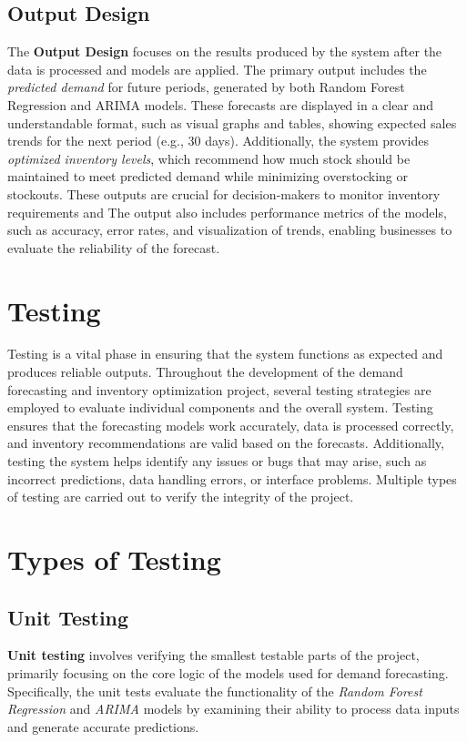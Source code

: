 \documentclass[10pt]{report}
\begin{document}
\begin{center}
\subsection{Output Design}
The \textbf{Output Design} focuses on the results produced by the system after the data is processed and models are applied. The primary output includes the \textit{predicted demand} for future periods, generated by both Random Forest Regression and ARIMA models. These forecasts are displayed in a clear and understandable format, such as visual graphs and tables, showing expected sales trends for the next period (e.g., 30 days). Additionally, the system provides \textit{optimized inventory levels}, which recommend how much stock should be maintained to meet predicted demand while minimizing overstocking or stockouts. These outputs are crucial for decision-makers to monitor inventory requirements and The output also includes performance metrics of the models, such as accuracy, error rates, and visualization of trends, enabling businesses to evaluate the reliability of the forecast.

\section{Testing}

Testing is a vital phase in ensuring that the system functions as expected and produces reliable outputs. Throughout the development of the demand forecasting and inventory optimization project, several testing strategies are employed to evaluate individual components and the overall system. Testing ensures that the forecasting models work accurately, data is processed correctly, and inventory recommendations are valid based on the forecasts. Additionally, testing the system helps identify any issues or bugs that may arise, such as incorrect predictions, data handling errors, or interface problems. Multiple types of testing are carried out to verify the integrity of the project.

\section{Types of Testing}

\subsection{Unit Testing}
\textbf{Unit testing} involves verifying the smallest testable parts of the project, primarily focusing on the core logic of the models used for demand forecasting. Specifically, the unit tests evaluate the functionality of the \textit{Random Forest Regression} and \textit{ARIMA} models by examining their ability to process data inputs and generate accurate predictions.


\end{center}
\end{document}
